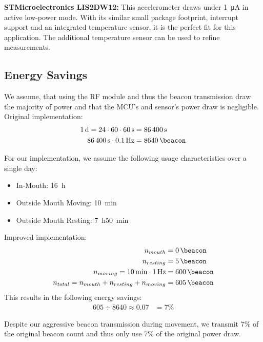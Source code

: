 \documentclass[a4paper,12pt]{article}
\begin{document}
\noindent\textbf{STMicroelectronics LIS2DW12:} This accelerometer draws under \SI{1}{\micro\ampere} in active low-power mode. With its similar small package footprint, interrupt support and an integrated temperature sensor, it is the perfect fit for this application. The additional temperature sensor can be used to refine measurements.

\subsection{Energy Savings}
We assume, that using the RF module and thus the beacon transmission draw the majority of power and that the MCU's and sensor's power draw is negligible. \\
Original implementation:
\begin{align}
	\qty{1}{\day} = 24 \cdot{} 60 \cdot{} \SI{60}{\second} & = \SI{86400}{\second} \notag \\
	\SI{86400}{\second} \cdot{} \SI{0.1}{\hertz}           & = \SI{8640}{\beacon}
\end{align}

For our implementation, we assume the following usage characteristics over a single day:

\begin{itemize}
	\item In-Mouth: \qty{16}{\hour}
	\item Outside Mouth Moving: \qty{10}{\minute}
	\item Outside Mouth Resting: \qty{7}{\hour}\qty{50}{\minute}
\end{itemize}
Improved implementation:
\begin{align}
	n_{mouth}                                           & = \SI{0}{\beacon}             \notag \\
	n_{resting}                                         & = \SI{5}{\beacon}           \notag   \\
	n_{moving} = \qty{10}{\minute} \cdot \SI{1}{\hertz} & = \SI{600}{\beacon}          \notag  \\
	n_{total} = n_{mouth} + n_{resting} + n_{moving}    & = \SI{605}{\beacon}
\end{align}
This results in the following energy savings:
\begin{align}
	605 \div 8640 \approx 0.07 & = 7\%
\end{align}

Despite our aggressive beacon transmission during movement, we transmit 7\% of the original beacon count and thus only use 7\% of the original power draw.
\end{document}
